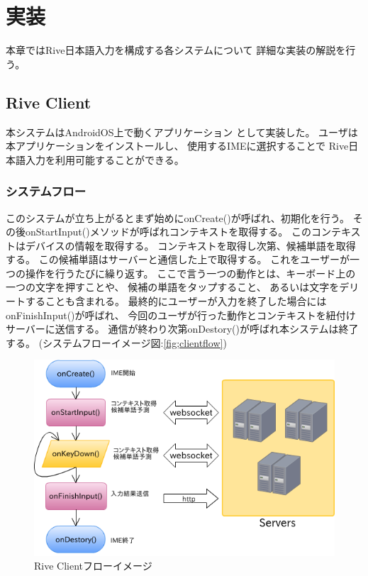 \chapter{実装}
\label{chap:implementation}
本章ではRive日本語入力を構成する各システムについて
詳細な実装の解説を行う。

\newpage
\section{Rive Client}
\label{sec:riveclient}
本システムはAndroidOS\cite{android}上で動くアプリケーション
として実装した。
ユーザは本アプリケーションをインストールし、
使用するIMEに選択することで
Rive日本語入力を利用可能することができる。

\subsection{システムフロー}
このシステムが立ち上がるとまず始めにonCreate()が呼ばれ、初期化を行う。
その後onStartInput()メソッドが呼ばれコンテキストを取得する。
このコンテキストはデバイスの情報を取得する。
コンテキストを取得し次第、候補単語を取得する。
この候補単語はサーバーと通信した上で取得する。
これをユーザーが一つの操作を行うたびに繰り返す。
ここで言う一つの動作とは、キーボード上の一つの文字を押すことや、
候補の単語をタップすること、
あるいは文字をデリートすることも含まれる。
最終的にユーザーが入力を終了した場合にはonFinishInput()が呼ばれ、
今回のユーザが行った動作とコンテキストを紐付けサーバーに送信する。
通信が終わり次第onDestory()が呼ばれ本システムは終了する。
(システムフローイメージ図:\ref{fig;clientflow})
\begin{figure}[htbp]
  \begin{center}
    \includegraphics[width=14cm,bb=0 0 562 366]{images/clientflow}
  \end{center}
  \caption{Rive Clientフローイメージ}
  \label{fig:clientflow}
\end{figure}

